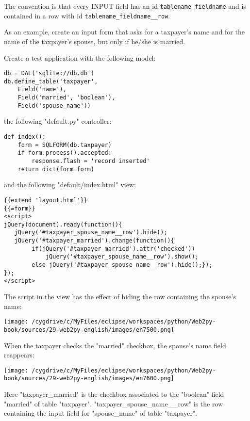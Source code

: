 \documentclass[justified,sixbynine,notoc]{tufte-book}
\def\ft{\small\tt}
\begin{document}
\begin{fullwidth}
The convention is that every INPUT field has an id {\ft tablename\_fieldname} and is contained in a row with id {\ft tablename\_fieldname\_\_row}.

As an example, create an input form that asks for a taxpayer's name and for the name of the taxpayer's spouse, but only if he/she is married.

Create a test application with the following model:
\begin{lstlisting}
db = DAL('sqlite://db.db')
db.define_table('taxpayer',
    Field('name'),
    Field('married', 'boolean'),
    Field('spouse_name'))
\end{lstlisting}
\noindent the following "default.py" controller:
\begin{lstlisting}
def index():
    form = SQLFORM(db.taxpayer)
    if form.process().accepted:
        response.flash = 'record inserted'
    return dict(form=form)
\end{lstlisting}
\noindent and the following "default/index.html" view:
\begin{lstlisting}[keywords={}]
{{extend 'layout.html'}}
{{=form}}
<script>
jQuery(document).ready(function(){
   jQuery('#taxpayer_spouse_name__row').hide();
   jQuery('#taxpayer_married').change(function(){
        if(jQuery('#taxpayer_married').attr('checked'))
            jQuery('#taxpayer_spouse_name__row').show();
        else jQuery('#taxpayer_spouse_name__row').hide();});
});
</script>
\end{lstlisting}

The script in the view has the effect of hiding the row containing the spouse's name:


\goodbreak\begin{center}\texttt{[image: /cygdrive/c/MyFiles/eclipse/workspaces/python/Web2py-book/sources/29-web2py-english/images/en7500.png]}\end{center}


When the taxpayer checks the "married" checkbox, the spouse's name field reappears:


\goodbreak\begin{center}\texttt{[image: /cygdrive/c/MyFiles/eclipse/workspaces/python/Web2py-book/sources/29-web2py-english/images/en7600.png]}\end{center}


Here "taxpayer\_married" is the checkbox associated to the "boolean" field "married" of table "taxpayer". "taxpayer\_spouse\_name\_\_row" is the row containing the input field for "spouse\_name" of table "taxpayer".


\end{fullwidth}
\end{document}
